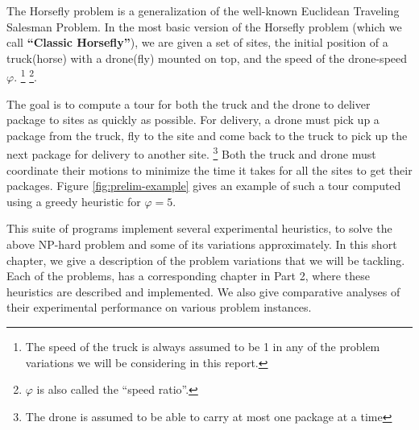 \documentclass[12pt]{report}
\begin{document}
The Horsefly problem is a generalization of the well-known Euclidean Traveling Salesman Problem.
In the most basic version of the Horsefly problem (which we call \textbf{``Classic Horsefly''}), we are given a set of sites, the
initial position of a truck(horse) with a drone(fly) mounted on top, and the speed of the
drone-speed $\varphi$. \footnote{ The speed of the truck is always assumed to be 1 in any of the problem 
  variations we will be considering in this report.} \footnote{ $\varphi$ is also called the ``speed ratio''.}. 

The goal is to compute a tour for both the truck and the drone to deliver package to sites
as quickly as possible. For delivery, a drone must pick up a package from the
truck, fly to the site and come back to the truck to pick up the next package for
delivery to another site. \footnote{ The drone is assumed to be able to carry at most one package at a time }
Both the truck and drone must coordinate their motions to minimize the time it takes for
all the sites to get their packages. Figure \ref{fig:prelim-example} gives an example of such a tour
computed using a greedy heuristic for $\varphi=5$.


This suite of programs implement several experimental heuristics, to solve the above NP-hard
problem and some of its variations approximately. In this short chapter, we give a description 
of the problem variations that we will be tackling. Each of the problems, has a corresponding chapter 
in Part 2, where these heuristics are described and implemented. We also give comparative analyses of 
their experimental performance on various problem instances. 

\vspace{0.5cm}
\end{document}
